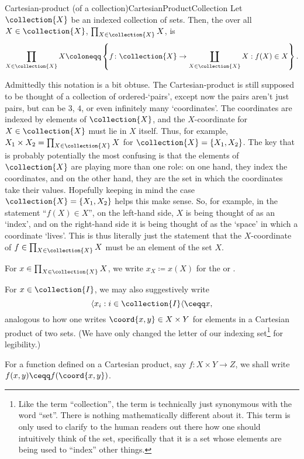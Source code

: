 \begin{dfn}{Cartesian-product (of a collection)}{CartesianProductCollection}
Let $\collection{X}$ be an indexed collection of sets.  Then, the  over all $X\in \collection{X}$, $\prod _{X\in \collection{X}}X$, is
\begin{equation}
\prod _{X\in \collection{X}}X\coloneqq \left\{ f\colon \collection{X}\rightarrow \coprod _{X\in \collection{X}}X:f(X)\in X\right\} .
\end{equation}
\begin{rmk}
Admittedly this notation is a bit obtuse.  The Cartesian-product is still supposed to be thought of a collection of ordered-`pairs', except now the pairs aren't just pairs, but can be $3$, $4$, or even infinitely many `coordinates'.  The coordinates are indexed by elements of $\collection{X}$, and the $X$-coordinate for $X\in \collection{X}$ must lie in $X$ itself.  Thus, for example, $X_1\times X_2=\prod _{X\in \collection{X}}X$ for $\collection{X}=\{ X_1,X_2\}$.  The key that is probably potentially the most confusing is that the elements of $\collection{X}$ are playing more than one role:  on one hand, they index the coordinates, and on the other hand, they are the set in which the coordinates take their values.  Hopefully keeping in mind the case $\collection{X}=\{ X_1,X_2\}$ helps this make sense.  So, for example, in the statement ``$f(X)\in X$'', on the left-hand side, $X$ is being thought of as an `index', and on the right-hand side it is being thought of as the `space' in which a coordinate `lives'.  This is thus literally just the statement that the $X$-coordinate of $f\in \prod _{X\in \collection{X}}X$ must be an element of the set $X$.
\end{rmk}
\begin{rmk}
For $x\in \prod _{X\in \collection{X}}X$, we write $x_X\coloneqq x(X)$ for the  or .
\end{rmk}
\begin{rmk}
For $x\in \collection{I}$, we may also suggestively write
\begin{equation}
\langle x_i:i\in \collection{I}\langle \ceqq x,
\end{equation}
analogous to how one writes $\coord{x,y}\in X\times Y$ for elements in a Cartesian product of two sets.  (We have only changed the letter of our indexing set\footnote{Like the term ``collection'', the term  is technically just synonymous with the word ``set''.  There is nothing mathematically different about it.  This term is only used to clarify to the human readers out there how one should intuitively think of the set, specifically that it is a set whose elements are being used to ``index'' other things.} for legibility.)	
\end{rmk}
\begin{rmk}
For a function defined on a Cartesian product, say $f\colon X\times Y\rightarrow Z$, we shall write $f(x,y)\ceqq f(\coord{x,y})$.
\end{rmk}
\end{dfn}
